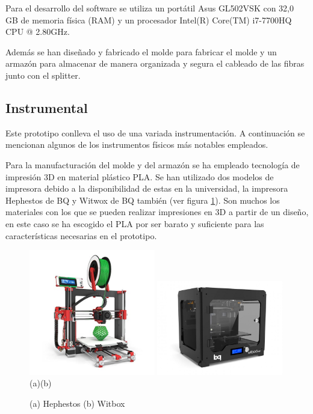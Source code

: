 Para el desarrollo del software se utiliza un portátil Asus GL502VSK con 32,0 GB de memoria física (RAM) y un procesador Intel(R) Core(TM) i7-7700HQ CPU @ 2.80GHz.  

Además se han diseñado y fabricado el molde para fabricar el molde y  un armazón para almacenar de manera organizada y segura el cableado de las fibras junto con el splitter.

\subsection{Instrumental}
\label{sec:instrumental3}
Este prototipo conlleva el uso de una variada instrumentación. A continuación se mencionan algunos de los instrumentos físicos más notables empleados.  

Para la manufacturación del molde y del armazón se ha empleado tecnología de impresión 3D en material plástico PLA. Se han utilizado dos modelos de impresora debido a la disponibilidad de estas en la universidad, la impresora Hephestos de BQ y Witwox de BQ también (ver figura \ref{fig:impresoras3D}). Son muchos los materiales con los que se pueden realizar impresiones en 3D a partir de un diseño, en este caso se ha escogido el PLA por ser barato y suficiente para las características necesarias en el prototipo.
    
\begin{figure}[H]
	\centering
	\includegraphics[width=0.49\textwidth]{./img/hephestos}
	\includegraphics[width=0.49\textwidth]{./img/witbox} 
	\\(a)\hspace{7cm}(b)
	\caption{(a) Hephestos (b) Witbox} 
	\label{fig:impresoras3D}
\end{figure}

